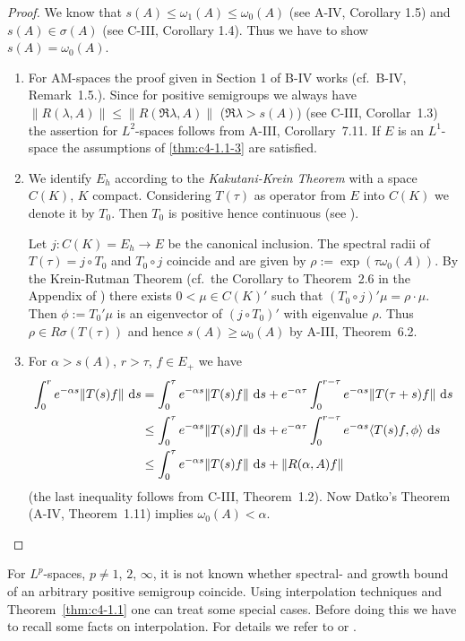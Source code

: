\begin{proof}
We know that $s(A) \leq \omega_{1}(A) \leq \omega_{0}(A)$ (see A-IV, Corollary 1.5) and $s(A) \in \sigma(A)$ (see C-III, Corollary 1.4).
Thus we have to show $s(A) = \omega_{0}(A)$.

\begin{enumerate}[\upshape (i), wide, labelindent=.5em]
\item 
For AM-spaces the proof given in Section 1 of B-IV works (cf.\ B-IV, Remark~1.5.).
Since for positive semigroups we always have $\|R(\lambda,A)\| \leq \|R(\Re \lambda, A)\|$ ($\Re \lambda > s(A)$) (see C-III, Corollar~1.3) the assertion for $L^{2}$-spaces follows from A-III, Corollary~7.11.
If $E$ is an $L^{1}$-space the assumptions of  \ref{thm:c4-1.1-3} are satisfied.

\item 
We identify $E_{h}$ according to the \emph{Kakutani-Krein Theorem} with a space $C(K)$, $K$ compact.
Considering $T(\tau)$ as operator from $E$ into $C(K)$ we denote it by $T_{0}$.
Then $T_{0}$ is positive hence continuous (see \citet[Theorem~5.3]{schaefer:1974}).

Let $j \colon C(K) = E_{h} \to E$ be the canonical inclusion.
The spectral radii of $T(\tau) = j \circ T_{0}$ and $T_{0} \circ j$ coincide and are given by $\rho := \exp(\tau \omega_{0}(A))$.
By the Krein-Rutman Theorem (cf.\ the Corollary to Theorem~2.6 in the Appendix of \citet{schaefer:1966}) there exists $0 < \mu \in C(K)'$ such that $(T_{0} \circ j)'\mu = \rho \cdot \mu$.
Then $\phi := T_{0}'\mu$ is an eigenvector of $(j \circ T_{0})'$ with eigenvalue $\rho$.
Thus $\rho \in R\sigma(T(\tau))$ and hence $s(A) \geq \omega_{0}(A)$ by A-III, Theorem~6.2.

\item
For $\alpha > s(A)$, $r > \tau$, $f \in E_{+}$ we have
\begin{align*}
\int_{0}^{r} e^{-\alpha s}\|T(s)f\| \, \mathop{}\!\mathrm{d}{s} &= \int_{0}^{\tau} e^{-\alpha s}\|T(s)f\| \, \mathop{}\!\mathrm{d}{s} + e^{-\alpha \tau}\int_{0}^{r-\tau} e^{-\alpha s}\|T(\tau+s)f\| \, \mathop{}\!\mathrm{d}{s} \\
&\leq \int_{0}^{\tau} e^{-\alpha s}\|T(s)f\| \, \mathop{}\!\mathrm{d}{s} + e^{-\alpha \tau}\int_{0}^{r-\tau} e^{-\alpha s}\langle T(s)f,\phi \rangle \, \mathop{}\!\mathrm{d}{s} \\
&\leq \int_{0}^{\tau} e^{-\alpha s}\|T(s)f\| \, \mathop{}\!\mathrm{d}{s} + \|R(\alpha,A)f\|
\end{align*}
(the last inequality follows from C-III, Theorem~1.2).
Now Datko's Theorem (A-IV, Theorem~1.11) implies $\omega_{0}(A) < \alpha$.
\end{enumerate}
\end{proof}
For $L^{p}$-spaces, $p \neq 1$, $2$, $\infty$, it is not known whether spectral- and growth bound of an arbitrary positive semigroup coincide.
Using interpolation techniques and  Theorem~\ref{thm:c4-1.1}  one can treat some special cases.
Before doing this we have to recall some facts on interpolation.
For details we refer to 
\citet[VI.10]{dunfordschwartz:1958} or \citet[IX.4.]{reedsimon:1975}.

